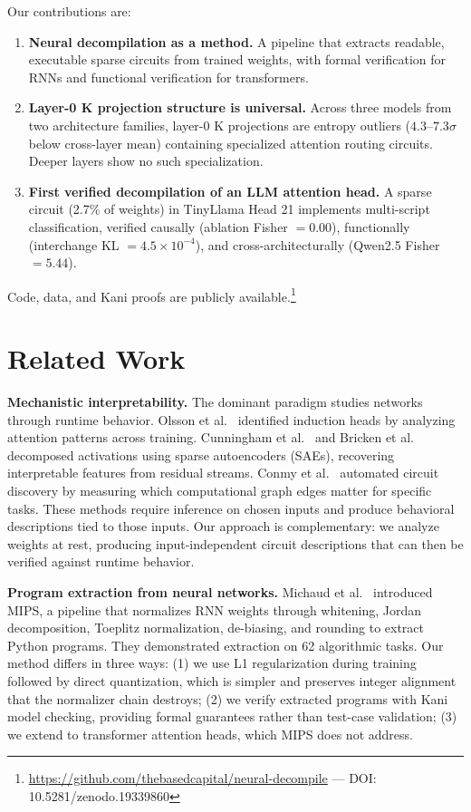 \documentclass[11pt]{article}
\begin{document}
Our contributions are:
\begin{enumerate}[leftmargin=*,itemsep=2pt]
  \item \textbf{Neural decompilation as a method.} A pipeline that extracts readable, executable sparse circuits from trained weights, with formal verification for RNNs and functional verification for transformers.
  \item \textbf{Layer-0 K projection structure is universal.} Across three models from two architecture families, layer-0 K projections are entropy outliers ($4.3$--$7.3\sigma$ below cross-layer mean) containing specialized attention routing circuits. Deeper layers show no such specialization.
  \item \textbf{First verified decompilation of an LLM attention head.} A sparse circuit (2.7\% of weights) in TinyLlama Head 21 implements multi-script classification, verified causally (ablation Fisher $= 0.00$), functionally (interchange KL $= 4.5 \times 10^{-4}$), and cross-architecturally (Qwen2.5 Fisher $= 5.44$).
\end{enumerate}

Code, data, and Kani proofs are publicly available.\footnote{\url{https://github.com/thebasedcapital/neural-decompile} — DOI: 10.5281/zenodo.19339860}

\section{Related Work}

\textbf{Mechanistic interpretability.} The dominant paradigm studies networks through runtime behavior. Olsson et al.\ \cite{olsson2022} identified induction heads by analyzing attention patterns across training. Cunningham et al.\ \cite{cunningham2024} and Bricken et al.\ \cite{bricken2023} decomposed activations using sparse autoencoders (SAEs), recovering interpretable features from residual streams. Conmy et al.\ \cite{conmy2023} automated circuit discovery by measuring which computational graph edges matter for specific tasks. These methods require inference on chosen inputs and produce behavioral descriptions tied to those inputs. Our approach is complementary: we analyze weights at rest, producing input-independent circuit descriptions that can then be verified against runtime behavior.

\textbf{Program extraction from neural networks.} Michaud et al.\ \cite{michaud2024} introduced MIPS, a pipeline that normalizes RNN weights through whitening, Jordan decomposition, Toeplitz normalization, de-biasing, and rounding to extract Python programs. They demonstrated extraction on 62 algorithmic tasks. Our method differs in three ways: (1) we use L1 regularization during training followed by direct quantization, which is simpler and preserves integer alignment that the normalizer chain destroys; (2) we verify extracted programs with Kani model checking, providing formal guarantees rather than test-case validation; (3) we extend to transformer attention heads, which MIPS does not address.
\end{document}
